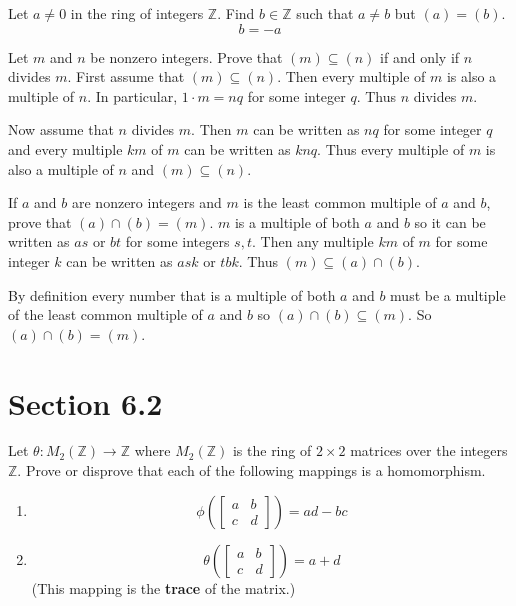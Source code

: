 \documentclass[paper=a4, fontsize=11pt]{jhwhw} %
\begin{document}
Let $a\not= 0$ in the ring of integers $\mathbb Z$. Find $b\in \mathbb Z$ such that $a\not=b$ but $(a) = (b)$. 
\solution
$$b = -a$$

Let $m$ and $n$ be nonzero integers. Prove that $(m)\subseteq (n)$ if and only if $n$ divides $m$.
\solution
First assume that $(m)\subseteq (n)$. Then every multiple of $m$ is also a multiple of $n$. In particular, $1\cdot m = nq$ for some integer $q$. Thus $n$ divides $m$.

Now assume that $n$ divides $m$. Then $m$ can be written as $nq$ for some integer $q$ and every multiple $km$ of $m$ can be written as $knq$. Thus every multiple of $m$ is also a multiple of $n$ and $(m)\subseteq (n)$.

If $a$ and $b$ are nonzero integers and $m$ is the least common multiple of $a$ and $b$, prove that $(a)\cap (b) = (m)$. 
\solution
$m$ is a multiple of both $a$ and $b$ so it can be written as $as$ or $bt$ for some integers $s, t$. Then any multiple $km$ of $m$ for some integer $k$ can be written as $ask$ or $tbk$. Thus $(m)\subseteq (a)\cap (b)$. 

By definition every number that is a multiple of both $a$ and $b$ must be a multiple of the least common multiple of $a$ and $b$ so $(a)\cap(b) \subseteq (m)$. So $(a)\cap (b) = (m)$. 

\newpage
\section*{Section 6.2}
Let $\theta: M_2(\mathbb Z)\to \mathbb Z$ where $M_2(\mathbb Z)$ is the ring of $2\times 2$ matrices over the integers $\mathbb Z$. Prove or disprove that each of the following mappings is a homomorphism.
\begin{enumerate}
    \item 
        $$ \phi\left(
        \left[ \begin{array}{cc}
        a & b \\
    c & d \end{array} \right]\right) = ad-bc
        $$
    \item 
        $$
        \theta\left(
        \left[ \begin{array}{cc}
        a & b \\
    c & d \end{array} \right]
    \right) = a + d$$ (This mapping is the \textbf{trace} of the matrix.)
\end{enumerate}
\solution
\end{document}
